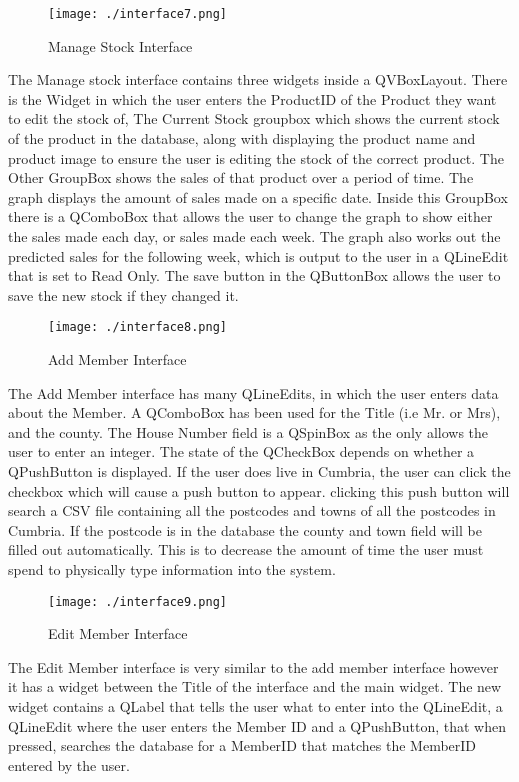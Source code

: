 \begin{figure}[H]
    \texttt{[image: ./interface7.png]}
    \caption{Manage Stock Interface} \label{fig:stock-interface}
\end{figure}

The Manage stock interface contains three widgets inside a QVBoxLayout. There is the Widget in which the user enters the ProductID of the Product they want to edit the stock of, The Current Stock groupbox which shows the current stock of the product in the database, along with displaying the product name and product image to ensure the user is editing the stock of the correct product. The Other GroupBox shows the sales of that product over a period of time. The graph displays the amount of sales made on a specific date. Inside this GroupBox there is a QComboBox that allows the user to change the graph to show either the sales made each day, or sales made each week. The graph also works out the predicted sales for the following week, which is output to the user in a QLineEdit that is set to Read Only. The save button in the QButtonBox allows the user to save the new stock if they changed it.

\begin{figure}[H]
    \texttt{[image: ./interface8.png]}
    \caption{Add Member Interface} \label{fig:add-member-instance}
\end{figure}

The Add Member interface has many QLineEdits, in which the user enters data about the Member. A QComboBox has been used for the Title (i.e Mr. or Mrs), and the county. The House Number field is a QSpinBox as the only allows the user to enter an integer. The state of the QCheckBox depends on whether a QPushButton is displayed. If the user does live in Cumbria, the user can click the checkbox which will cause a push button to appear. clicking this push button will search a CSV file containing all the postcodes and towns of all the postcodes in Cumbria. If the postcode is in the database the county and town field will be filled out automatically. This is to decrease the amount of time the user must spend to physically type information into the system.


\begin{figure}[H]
    \texttt{[image: ./interface9.png]}
    \caption{Edit Member Interface} \label{fig:edit-member-instance}
\end{figure}

The Edit Member interface is very similar to the add member interface however it has a widget between the Title of the interface and the main widget. The new widget contains a QLabel that tells the user what to enter into the QLineEdit, a QLineEdit where the user enters the Member ID and a QPushButton, that when pressed, searches the database for a MemberID that matches the MemberID entered by the user. 

